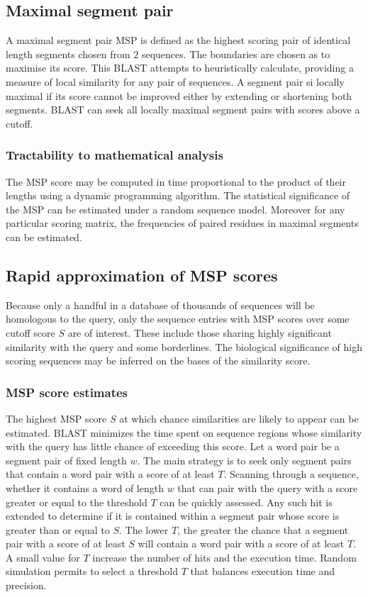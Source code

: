 		\subsection{Maximal segment pair}
		A maximal segment pair MSP is defined as the highest scoring pair of identical length segments chosen from $2$ sequences.
		The boundaries are chosen as to maximise its score.
		This BLAST attempts to heuristically calculate, providing a measure of local similarity for any pair of sequences.
		A segment pair si locally maximal if its score cannot be improved either by extending or shortening both segments.
		BLAST can seek all locally maximal segment pairs with scores above a cutoff.

		\subsubsection{Tractability to mathematical analysis}
		The MSP score may be computed in time proportional to the product of their lengths using a dynamic programming algorithm.
		The statistical significance of the MSP can be estimated under a random sequence model.
		Moreover for any particular scoring matrix, the frequencies of paired residues in maximal segments can be estimated.

	\subsection{Rapid approximation of MSP scores}
	Because only a handful in a database of thousands of sequences will be homologous to the query, only the sequence entries with MSP scores over some cutoff score $S$ are of interest.
	These include those sharing highly significant similarity with the query and some borderlines.
	The biological significance of high scoring sequences may be inferred on the bases of the similarity score.

		\subsubsection{MSP score estimates}
		The highest MSP score $S$ at which chance similarities are likely to appear can be estimated.
		BLAST minimizes the time spent on sequence regions whose similarity with the query has little chance of exceeding this score.
		Let a word pair be a segment pair of fixed length $w$.
		The main strategy is to seek only segment pairs that contain a word pair with a score of at least $T$.
		Scanning through a sequence, whether it contains a word of length $w$ that can pair with the query with a score greater or equal to the threshold $T$ can be quickly assessed.
		Any such hit is extended to determine if it is contained within a segment pair whose score is greater than or equal to $S$.
		The lower $T$, the greater the chance that a segment pair with a score of at least $S$ will contain a word pair with a score of at least $T$.
		A small value for $T$ increase the number of hits and the execution time.
		Random simulation permits to select a threshold $T$ that balances execution time and precision.

